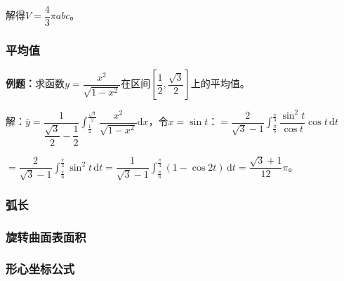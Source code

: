 \documentclass[UTF8, 12pt]{ctexart}
\begin{document}
解得$V=\dfrac{4}{3}\pi abc$。

\subsubsection{平均值}

\textbf{例题：}求函数$y=\dfrac{x^2}{\sqrt{1-x^2}}$在区间$\left[\dfrac{1}{2},\dfrac{\sqrt{3}}{2}\right]$上的平均值。

解：$\bar{y}=\dfrac{1}{\dfrac{\sqrt{3}}{2}-\dfrac{1}{2}}\displaystyle{\int_\frac{1}{2}^\frac{\sqrt{3}}{2}\dfrac{x^2}{\sqrt{1-x^2}}\textrm{d}x}$，令$x=\sin t$：$=\dfrac{2}{\sqrt{3}-1}\displaystyle{\int_\frac{\pi}{6}^\frac{\pi}{3}\dfrac{\sin^2t}{\cos t}\cos t\,\textrm{d}t}$ \medskip

$=\dfrac{2}{\sqrt{3}-1}\int_\frac{\pi}{6}^\frac{\pi}{3}\sin^2t\,\textrm{d}t=\dfrac{1}{\sqrt{3}-1}\int_\frac{\pi}{6}^\frac{\pi}{3}(1-\cos2t)\,\textrm{d}t=\dfrac{\sqrt{3}+1}{12}\pi$。

\subsubsection{弧长}




\subsubsection{旋转曲面表面积}

\subsubsection{形心坐标公式}

\end{document}
